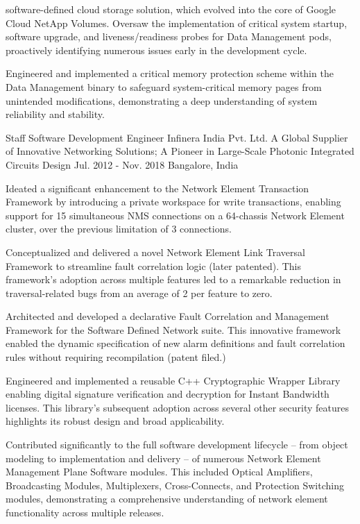 \begin{cventries}
{\begin{cvitems}
{		software-defined cloud storage solution, which evolved into the core of Google Cloud NetApp Volumes.
		Oversaw the implementation of critical system startup, software upgrade, and liveness/readiness probes for
		Data Management pods, proactively identifying numerous issues early in the development cycle.}
        \item {Engineered and implemented a critical memory protection scheme within the Data Management binary to safeguard
		system-critical memory pages from unintended modifications, demonstrating a deep understanding of system
		reliability and stability.}
      \end{cvitems}
    }

  \expentry
    {Staff Software Development Engineer} %
    {Infinera} {India Pvt. Ltd.} %
    {A Global Supplier of Innovative Networking Solutions; A Pioneer in Large-Scale Photonic Integrated Circuits Design} %
    {Jul. 2012 - Nov. 2018} %
    {Bangalore, India} %
    {
      \begin{cvitems} %
      \item {Ideated a significant enhancement to the Network Element Transaction Framework by introducing a private
	      workspace for write transactions, enabling support for 15 simultaneous NMS connections on a 64-chassis
	      Network Element cluster, over the previous limitation of 3 connections.}
      \item {Conceptualized and delivered a novel Network Element Link Traversal Framework to streamline fault correlation
	      logic (later patented). This framework's adoption across multiple features led to a remarkable reduction in
	      traversal-related bugs from an average of 2 per feature to zero.}
      \item {Architected and developed a declarative Fault Correlation and Management Framework for the Software
	      Defined Network suite. This innovative framework enabled the dynamic specification of new alarm
	      definitions and fault correlation rules without requiring recompilation (patent filed.)}
      \item {Engineered and implemented a reusable C++ Cryptographic Wrapper Library enabling digital signature
	      verification and decryption for Instant Bandwidth licenses. This library's subsequent
	      adoption across several other security features highlights its robust design and broad applicability.}
      \item {Contributed significantly to the full software development lifecycle – from object modeling to implementation
	      and delivery – of numerous Network Element Management Plane Software modules. This included Optical
	      Amplifiers, Broadcasting Modules, Multiplexers, Cross-Connects, and Protection Switching modules,
	      demonstrating a comprehensive understanding of network element functionality across multiple releases.
	      }
      \end{cvitems}
    }


\end{cventries}
